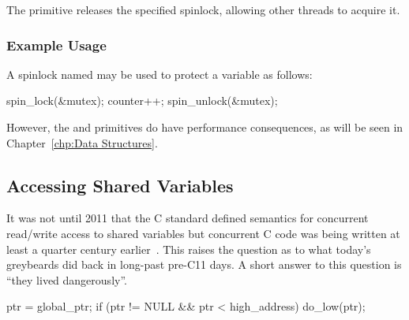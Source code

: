The  primitive releases the specified spinlock,
allowing other threads to acquire it.


\subsubsection{Example Usage}

A spinlock named  may be used to protect a variable
 as follows:

\begin{VerbatimU}
spin_lock(&mutex);
counter++;
spin_unlock(&mutex);
\end{VerbatimU}

\QuickQuizEnd

However, the  and  primitives
do have performance consequences, as will be seen in
Chapter~\ref{chp:Data Structures}.

\subsection{Accessing Shared Variables}
\label{sec:toolsoftrade:Accessing Shared Variables}

It was not until 2011 that the C standard defined semantics for concurrent
read/write access to shared variables but concurrent C code was being
written at least a quarter century earlier~\cite{Beck85,Inman85}.
This raises the question as to what today's greybeards did back
in long-past pre-C11 days.
A short answer to this question is ``they lived dangerously''.

\begin{listing}[tbp]
\begin{fcvlabel}
\begin{VerbatimL}[commandchars=\\\{\}]
ptr = global_ptr;
if (ptr != NULL && ptr < high_address)
	do_low(ptr);
\end{VerbatimL}
\end{fcvlabel}
\caption{Living Dangerously Early 1990s Style}
\label{lst:toolsoftrade:Living Dangerously Early 1990s Style}
\end{listing}

